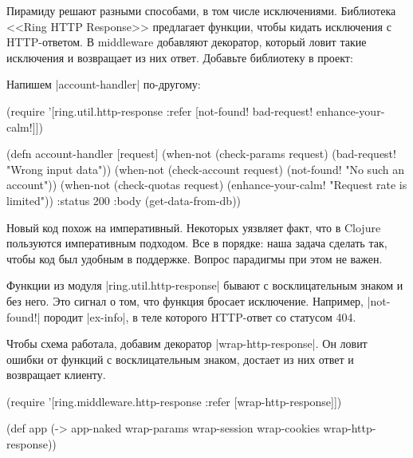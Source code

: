 Пирамиду решают разными способами, в том числе исключениями. Библиотека <<Ring
HTTP Response>> предлагает функции, чтобы кидать исключения с HTTP-ответом. В
middleware добавляют декоратор, который ловит такие исключения и возвращает из
них ответ. Добавьте библиотеку в проект:

\begin{english}
  \begin{clojure}
  \end{clojure}
\end{english}

\noindent
Напишем \spverb|account-handler| по-другому:

\begin{english}
  \begin{clojure}
(require '[ring.util.http-response
           :refer [not-found!
                   bad-request!
                   enhance-your-calm!]])

(defn account-handler [request]
  (when-not (check-params request)
    (bad-request! "Wrong input data"))
  (when-not (check-account request)
    (not-found! "No such an account"))
  (when-not (check-quotas request)
    (enhance-your-calm! "Request rate is limited"))
  {:status 200
   :body (get-data-from-db)})
  \end{clojure}
\end{english}

Новый код похож на императивный. Некоторых уязвляет факт, что в Clojure
пользуются императивным подходом. Все в порядке: наша задача сделать так, чтобы
код был удобным в поддержке. Вопрос парадигмы при этом не важен.

Функции из модуля \spverb|ring.util.http-response| бывают с восклицательным
знаком и без него. Это сигнал о том, что функция бросает исключение. Например,
\spverb|not-found!| породит \spverb|ex-info|, в теле которого HTTP-ответ со
статусом 404.

Чтобы схема работала, добавим декоратор \spverb|wrap-http-response|. Он ловит
ошибки от функций с восклицательным знаком, достает из них ответ и возвращает
клиенту.

\begin{english}
  \begin{clojure}
(require '[ring.middleware.http-response
           :refer [wrap-http-response]])

(def app
  (-> app-naked
      wrap-params
      wrap-session
      wrap-cookies
      wrap-http-response))
  \end{clojure}
\end{english}

